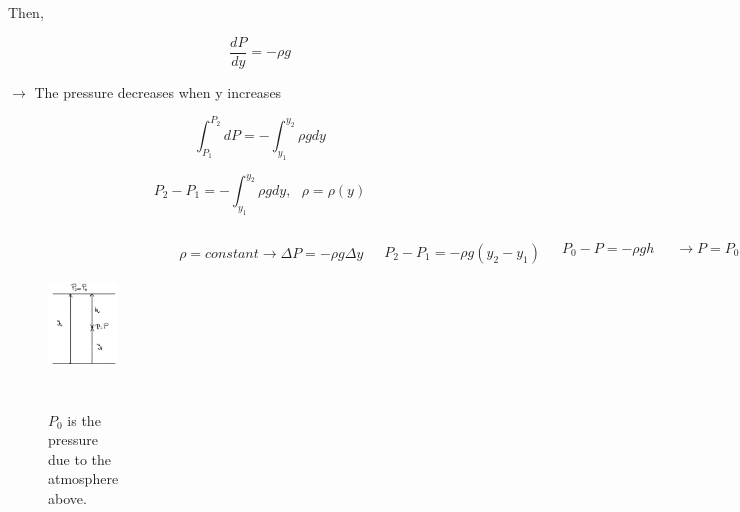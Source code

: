 \documentclass[]{beamer}
\begin{document}
\begin{frame}

  Then,
  
  \begin{equation*}
  \frac{dP}{dy}=-\rho g 
  \end{equation*}
  
  \vspace{3mm}
  
  $\rightarrow$ The pressure  decreases when y  increases 
  
  \begin{equation*}
  \int^{P_2}_{P_1} dP=- \int^{y_2}_{y_1} \rho g dy
  \end{equation*}
  
  \begin{equation*}
  P_2-P_1=- \int^{y_2}_{y_1} \rho g dy, \ \ \ \rho=\rho(y)
  \end{equation*}
  
    \end{frame}




\begin{frame}


  \begin{columns}[c]
   \column{2in}  %
  
  \begin{center}
    \begin{figure}
      \includegraphics[height=1.7in]{images2/prho3.jpg}
      \caption{$P_0$ is the pressure due to the atmosphere above.}
    \end{figure}

\end{center}


  \column{2in}
    $\rho=constant \rightarrow \Delta P=-\rho g \Delta y$ 

    \begin{equation*}
      P_2-P_1=-\rho g (y_2-y_1)
    \end{equation*}


    \begin{equation*}
      P_0-P=-\rho gh
    \end{equation*}

    \begin{equation}
      \rightarrow  \boxed{P=P_0+\rho gh}
    \end{equation}


   \end{columns}



  \end{frame}
\end{document}
